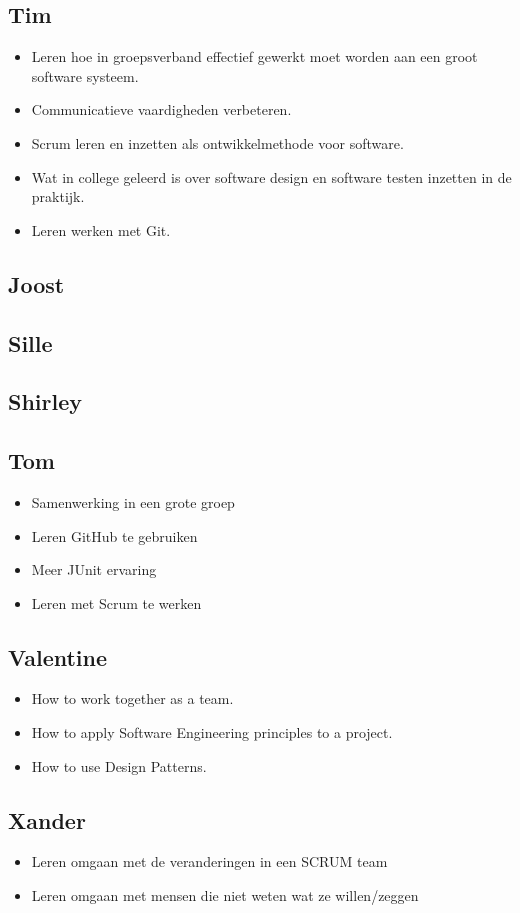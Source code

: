 \documentclass{article}
\begin{document}
\subsection*{Tim}
\begin{itemize}
	\item Leren hoe in groepsverband effectief gewerkt moet worden aan een groot software systeem.
	\item Communicatieve vaardigheden verbeteren.
	\item Scrum leren en inzetten als ontwikkelmethode voor software.
	\item Wat in college geleerd is over software design en software testen inzetten in de praktijk.
	\item Leren werken met Git.
\end{itemize}
\subsection*{Joost}
\subsection*{Sille}
\subsection*{Shirley}
\subsection*{Tom}
\begin{itemize}
	\item Samenwerking in een grote groep
	\item Leren GitHub te gebruiken
	\item Meer JUnit ervaring
	\item Leren met Scrum te werken
\end{itemize}
\subsection*{Valentine}
\begin{itemize}
	\item How to work together as a team.
	\item How to apply Software Engineering principles to a project.
	\item How to use Design Patterns.
\end{itemize}

\subsection*{Xander}
\begin{itemize}
	\item Leren omgaan met de veranderingen in een SCRUM team
	\item Leren omgaan met mensen die niet weten wat ze willen/zeggen
\end{itemize}
\end{document}
